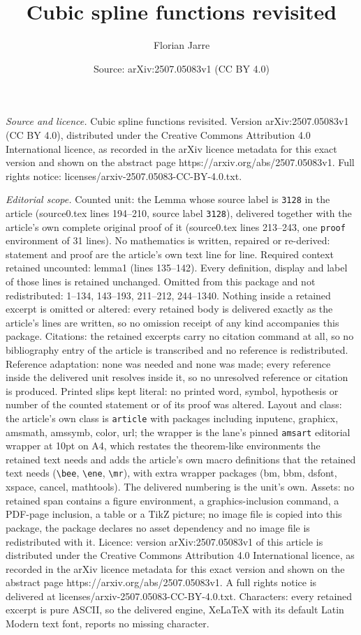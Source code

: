 \documentclass[10pt,a4paper]{amsart}
\title[Cubic spline functions revisited]{Cubic spline functions revisited}
\author{Florian Jarre}
\date{Source: arXiv:2507.05083v1 (CC BY 4.0)}
\begin{document}
\maketitle

\noindent\emph{Source and licence.} Cubic spline functions revisited. Version arXiv:2507.05083v1 (CC BY 4.0), distributed under the Creative Commons Attribution 4.0 International licence, as recorded in the arXiv licence metadata for this exact version and shown on the abstract page https://arxiv.org/abs/2507.05083v1. Full rights notice: licenses/arxiv-2507.05083-CC-BY-4.0.txt.\par\smallskip

\noindent\textit{Editorial scope.} Counted unit: the Lemma whose source label is \texttt{3128} in the article (source0.tex lines 194--210, source label \texttt{3128}), delivered together with the article's own complete original proof of it (source0.tex lines 213--243, one \texttt{proof} environment of 31 lines). No mathematics is written, repaired or re-derived: statement and proof are the article's own text line for line. Required context retained uncounted: lemma1 (lines 135--142). Every definition, display and label of those lines is retained unchanged. Omitted from this package and not redistributed: 1--134, 143--193, 211--212, 244--1340. Nothing inside a retained excerpt is omitted or altered: every retained body is delivered exactly as the article's lines are written, so no omission receipt of any kind accompanies this package. Citations: the retained excerpts carry no citation command at all, so no bibliography entry of the article is transcribed and no reference is redistributed. Reference adaptation: none was needed and none was made; every reference inside the delivered unit resolves inside it, so no unresolved reference or citation is produced. Printed slips kept literal: no printed word, symbol, hypothesis or number of the counted statement or of its proof was altered. Layout and class: the article's own class is \texttt{article} with packages including inputenc, graphicx, amsmath, amssymb, color, url; the wrapper is the lane's pinned \texttt{amsart} editorial wrapper at 10pt on A4, which restates the theorem-like environments the retained text needs and adds the article's own macro definitions that the retained text needs (\texttt{\textbackslash bee}, \texttt{\textbackslash ene}, \texttt{\textbackslash mr}), with extra wrapper packages (bm, bbm, dsfont, xspace, cancel, mathtools). The delivered numbering is the unit's own. Assets: no retained span contains a figure environment, a graphics-inclusion command, a PDF-page inclusion, a table or a TikZ picture; no image file is copied into this package, the package declares no asset dependency and no image file is redistributed with it. Licence: version arXiv:2507.05083v1 of this article is distributed under the Creative Commons Attribution 4.0 International licence, as recorded in the arXiv licence metadata for this exact version and shown on the abstract page https://arxiv.org/abs/2507.05083v1. A full rights notice is delivered at licenses/arxiv-2507.05083-CC-BY-4.0.txt. Characters: every retained excerpt is pure ASCII, so the delivered engine, XeLaTeX with its default Latin Modern text font, reports no missing character.
\end{document}
